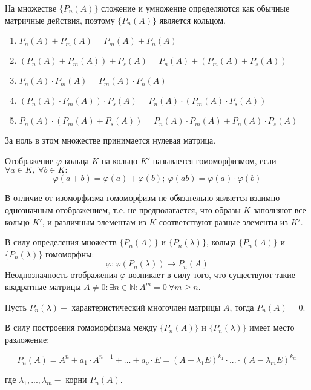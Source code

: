 На множестве $\{P_n(A)\}$ сложение и умножение определяются как обычные матричные действия, поэтому $\{P_n(A)\}$ является кольцом.

\begin{enumerate}
	\item $P_n(A) + P_m(A) = P_m(A) + P_n(A)$
	\item $(P_n(A) + P_m(A)) + P_s(A) = P_n(A) + (P_m(A) + P_s(A))$
	\item $P_n(A) \cdot P_m(A) = P_m(A) \cdot P_n(A)$
	\item $(P_n(A) \cdot P_m(A)) \cdot P_s(A) = P_n(A) \cdot (P_m(A) \cdot P_s(A))$
	\item $P_n(A) \cdot (P_m(A) + P_s(A)) = P_n(A) \cdot P_m(A) + P_n(A) \cdot P_s(A)$
\end{enumerate}

За ноль в этом множестве принимается нулевая матрица.

\begin{definition}
	Отображение $\varphi$ кольца $K$ на кольцо $K'$ называется гомоморфизмом, если $\forall a \in K,~ \forall b \in K:$
	\[\varphi(a+b) = \varphi(a) + \varphi(b);~ \varphi(ab) = \varphi(a) \cdot \varphi(b)\] 
\end{definition}

В отличие от изоморфизма гомоморфизм не обязательно является взаимно однозначным отображением, т.е. не предполагается, что образы $K$ заполняют все кольцо $K'$, и различным элементам из $K$ соответствуют разные элементы из $K'$.

В силу определения множеств $\{P_n(A)\}$ и $\{P_n(\lambda)\}$, кольца $\{P_n(A)\}$ и $\{P_n(\lambda)\}$ гомоморфны:
\[\varphi: \varphi(P_n(\lambda)) \longrightarrow P_n(A)\]
Неоднозначность отображения $\varphi$ возникает в силу того, что существуют такие квадратные матрицы $A \neq 0: \exists n \in \mathbb {N}: A^m = 0~ \forall m \geqslant n$.

\begin{theorem}
	Пусть $P_n(\lambda) - $ характеристический многочлен матрицы $A$, тогда $P_n(A) = 0$.
\end{theorem}

В силу построения гомоморфизма между $\{P_n(A)\}$ и $\{P_n(\lambda)\}$ имеет место разложение:

\[P_n(A) = A^n + a_1 \cdot A^{n-1} + ... + a_o \cdot E = (A - \lambda_1 E)^{k_1} \cdot ... \cdot (A - \lambda_m E)^{k_m}\]

где $\lambda_1, ..., \lambda_m - $ корни $P_n(A)$.

